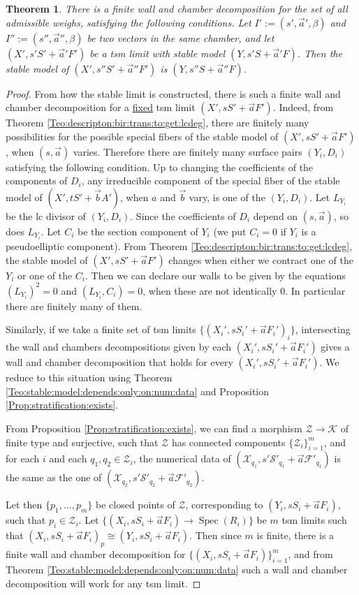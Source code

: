 \documentclass[11pt]{amsart}
\newcommand{\sF}{\mathscr{F}}
\newcommand{\sS}{\mathscr{S}}
\newcommand{\sX}{\mathscr{X}}
\newcommand{\sZ}{\mathscr{Z}}
\newcommand{\spec}{\operatorname{Spec}}
\newcommand{\Kg}{\mathcal{K}}
\newtheorem{Teo}[theorem]{Theorem}
\theoremstyle{definition}
\begin{document}
\begin{Teo}\label{Teo:wall:and:chamb:dec:stable:models} There is a finite wall and chamber decomposition for the set of all admissible weighs, satisfying the following conditions.
Let $I':=(s',\vec{a}',\beta)$ and $I'':=(s'',\vec{a}'',\beta)$ be two vectors in the same chamber,
and let $(X',s'S'+\vec{a}'F')$ be a tsm limit with stable model $(Y,s'S+\vec{a}'F)$. Then 
the stable model of $(X',s''S'+\vec{a}''F')$ is $(Y,s''S+\vec{a}''F)$.
\end{Teo}
\begin{proof}
From how the stable limit is constructed, there is such a finite wall and chamber decomposition for a \underline{fixed}
tsm limit $(X',sS'+\vec{a}F')$. Indeed, from Theorem \ref{Teo:descripton:bir:trans:to:get:lcdeg},
there are finitely many possibilities for the possible special fibers of the stable model of
$(X',sS'+\vec{a}F')$, when $(s,\vec{a})$ varies.
Therefore there are finitely many surface pairs $(Y_i,D_i)$ satisfying the following condition. Up to changing the coefficients of the components of $D_i$,
any irreducible component of the special fiber of the stable model of $(X',tS'+\vec{b}A')$, when $a$ and $\vec{b}$ vary, is one of the $(Y_i,D_i)$.
Let
$L_{Y_i}$ be the lc divisor of $(Y_i,D_i)$. Since the coefficients of  $D_i$ depend on $(s,\vec{a})$, so does $L_{Y_i}$.
Let $C_i$ be the section component of $Y_i$ (we put $C_i=0$ if $Y_i$ is a pseudoelliptic component).
From Theorem \ref{Teo:descripton:bir:trans:to:get:lcdeg},
the stable model of $(X',sS'+\vec{a}F')$ changes when either we contract one of the $Y_i$ or one of the $C_i$.
Then we can declare our walls to be given by the equations $(L_{Y_i})^2=0$ and $(L_{Y_i},C_i)=0$, when these
are not identically 0. In particular there are finitely many of them.

 
Similarly, if we take a finite set of tsm limits $\{(X_i',sS_i'+\vec{a}F_i')_i\}$,
intersecting the wall and chambers decompositions given by each
$(X_i',sS_i'+\vec{a}F_i')$ gives a wall and chamber decomposition that holds for every $(X_i',sS_i'+\vec{a}F_i')$. We reduce
to this situation using Theorem \ref{Teo:stable:model:depends:only:on:num:data} and Proposition \ref{Prop:stratification:exists}.

From Proposition \ref{Prop:stratification:exists}, we can find a morphism
$\sZ \to \Kg$ of finite type and surjective, such that $\sZ$ has connected components $\{\sZ_i\}_{i=1}^m$, and for each $i$ and each $q_1, q_2 \in \sZ_i$,
the numerical data of $(\sX_{q_1},s'\sS'_{q_1}+\vec{a}\sF'_{q_1})$ is the same as the one of
$(\sX_{q_2},s'\sS'_{q_2}+\vec{a}\sF'_{q_2})$. 

Let then $\{p_1,...,p_m\}$ be closed points of $\sZ$, corresponding to $(Y_i,sS_i+\vec{a}F_i)$, such that $p_i \in \sZ_i$.
Let $\{(X_i,sS_i+\vec{a}F_i) \to \spec(R_i)\}$
be $m$ tsm limits such that $(X_i,sS_i+\vec{a}F_i)_p \cong (Y_i,sS_i+\vec{a}F_i)$. Then since $m$ is finite, there is a finite wall and chamber decomposition
for $\{(X_i,sS_i+\vec{a}F_i)\}_{i=1}^m$, and from Theorem \ref{Teo:stable:model:depends:only:on:num:data}
such a wall and chamber decomposition will work for any tsm limit.
\end{proof}
\end{document}
